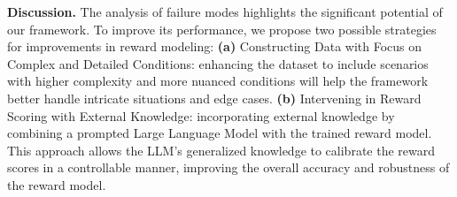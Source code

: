 \textbf{Discussion.}
The analysis of failure modes highlights the significant potential of our framework. To improve its performance, we propose two possible strategies for improvements in reward modeling:
\textbf{(a)} Constructing Data with Focus on Complex and Detailed Conditions: enhancing the dataset to include scenarios with higher complexity and more nuanced conditions will help the framework better handle intricate situations and edge cases.
\textbf{(b)} Intervening in Reward Scoring with External Knowledge: incorporating external knowledge by combining a prompted Large Language Model with the trained reward model. This approach allows the LLM's generalized knowledge to calibrate the reward scores in a controllable manner, improving the overall accuracy and robustness of the reward model.
